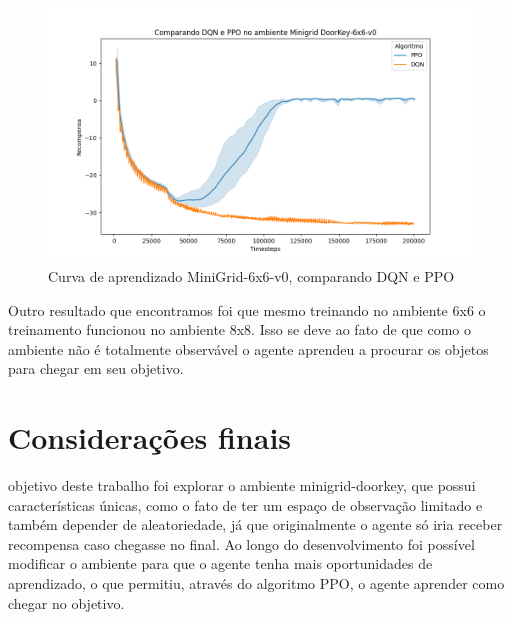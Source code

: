 \documentclass[9pt,a4paper,twoside]{tau}
\begin{document}
\begin{figure}[htbp]
    \centering
    \includegraphics[width=0.8\columnwidth]{assets/plot.png}
    \caption{Curva de aprendizado MiniGrid-6x6-v0, comparando DQN e PPO}
    \label{fig:figure}
\end{figure}

Outro resultado que encontramos foi que mesmo treinando no ambiente 6x6 o treinamento funcionou no ambiente 8x8. Isso se deve ao fato de que como o ambiente não é totalmente observável o agente aprendeu a procurar os objetos para chegar em seu objetivo.

\section{Considerações finais}

 objetivo deste trabalho foi explorar o ambiente minigrid-doorkey, que possui características únicas, como o fato de ter um espaço de observação limitado e também depender de aleatoriedade, já que originalmente o agente só iria receber recompensa caso chegasse no final. Ao longo do desenvolvimento foi possível modificar o ambiente para que o agente tenha mais oportunidades de aprendizado, o que permitiu, através do algoritmo PPO, o agente aprender como chegar no objetivo.
\printbibliography
\end{document}
